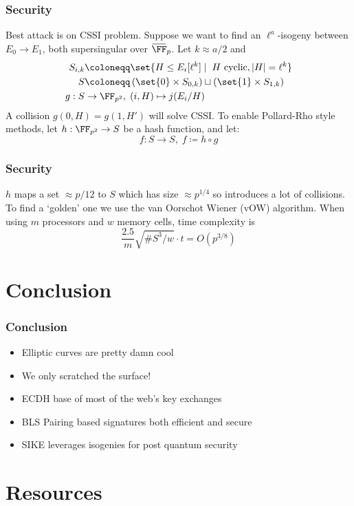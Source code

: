 \documentclass{beamer}
\newcommand{\overbar}[1]{\mkern 1.5mu\overline{\mkern-1.5mu#1\mkern-1.5mu}\mkern 1.5mu}
\begin{document}
\begin{frame}
    \frametitle{Security}
    Best attack is on CSSI problem.
    \pause 
    Suppose we want to find an $\ell^a$-isogeny  between $E_0 \to E_1$, both 
    supersingular over $\overbar{\FF}_p$.
    \pause Let $k \approx a/2$ and
    \begin{align*}
        S_{i, k} &\coloneqq \set{ H \leq E_i[\ell^k] \mid \; H \text{ cyclic}, |H| = \ell^k } \\
        S &\coloneqq \left( \set{0} \times S_{0, k} \right) \sqcup \left( \set{1} \times S_{1, k} \right) \\
        g: S &\to \FF_{p^2}, \; (i, H) \mapsto j(E_{i}/H)
    \end{align*}
    \pause
    A collision $g(0, H) = g(1, H')$ will solve CSSI.
    \pause To enable Pollard-Rho style methods, let $h: \FF_{p^2} \to S$ 
    be a hash function, and let:
    \[ f: S \to S,\; f \coloneqq h \circ g \]
\end{frame}

\begin{frame}
    \frametitle{Security}
    $h$ maps a set $\approx p/12$ to $S$ which has size $\approx p^{1/4}$ so introduces a lot of collisions.
    \pause
    To find a `golden' one we use the van Oorschot Wiener (vOW) algorithm. 
    \pause
    When using $m$ processors and $w$ memory cells, time complexity is 
    \[ \frac{2.5}{m}\sqrt{\#S^3/w}\cdot t = O(p^{3/8})  \]
\end{frame}

\section{Conclusion}
\begin{frame}
    \frametitle{Conclusion}
    \begin{itemize}
        \item<1-> Elliptic curves are pretty damn cool
        \item<1-> We only scratched the surface!
        \item<2-> ECDH base of most of the web's key exchanges
        \item<3-> BLS Pairing based signatures both efficient and secure
        \item<4-> SIKE leverages isogenies for post quantum security
    \end{itemize}
    

\end{frame}

\section{Resources}
\end{document}
